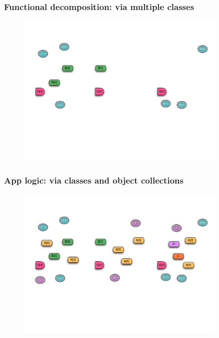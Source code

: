 \begin{frame}
  \frametitle{Functional decomposition: via multiple classes}
  \begin{figure}\includegraphics[width=0.9\textwidth]{../figures/progmodel/04-func-decomp-via-classes.pdf}\end{figure}
\end{frame}


\begin{frame}
  \frametitle{App logic: via classes and object collections}
  \begin{figure}\includegraphics[width=0.9\textwidth]{../figures/progmodel/05-parallelism-via-obj-collections.pdf}\end{figure}
\end{frame}


